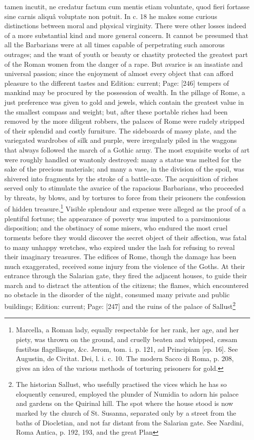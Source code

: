 {tamen incutit, ne credatur factum cum mentis etiam voluntate, quod fieri fortasse sine carnis aliquâ voluptate non potuit. In c. 18 he makes some curious distinctions between moral and physical virginity.} There were other losses indeed of a more substantial kind and more general concern. It cannot be presumed that all the Barbarians were at all times capable of perpetrating such amorous outrages; and the want of youth or beauty or chastity protected the greatest part of the Roman women from the danger of a rape. But avarice is an insatiate and universal passion; since the enjoyment of almost every object that can afford pleasure to the different tastes and Edition: current; Page: [246] tempers of mankind may be procured by the possession of wealth. In the pillage of Rome, a just preference was given to gold and jewels, which contain the greatest value in the smallest compass and weight; but, after these portable riches had been removed by the more diligent robbers, the palaces of Rome were rudely stripped of their splendid and costly furniture. The sideboards of massy plate, and the variegated wardrobes of silk and purple, were irregularly piled in the waggons that always followed the march of a Gothic army. The most exquisite works of art were roughly handled or wantonly destroyed: many a statue was melted for the sake of the precious materials; and many a vase, in the division of the spoil, was shivered into fragments by the stroke of a battle-axe. The acquisition of riches served only to stimulate the avarice of the rapacious Barbarians, who proceeded by threats, by blows, and by tortures to force from their prisoners the confession of hidden treasure.\footnote{Marcella, a Roman lady, equally respectable for her rank, her age, and her piety, was thrown on the ground, and cruelly beaten and whipped, cæsam fustibus flagellisque, \&c. Jerom, tom. i. p. 121, ad Principiam [ep. 16]. See Augustin, de Civitat. Dei, l. i. c. 10. The modern Sacco di Roma, p. 208, gives an idea of the various methods of torturing prisoners for gold.} Visible splendour and expense were alleged as the proof of a plentiful fortune; the appearance of poverty was imputed to a parsimonious disposition; and the obstinacy of some misers, who endured the most cruel torments before they would discover the secret object of their affection, was fatal to many unhappy wretches, who expired under the lash for refusing to reveal their imaginary treasures. The edifices of Rome, though the damage has been much exaggerated, received some injury from the violence of the Goths. At their entrance through the Salarian gate, they fired the adjacent houses, to guide their march and to distract the attention of the citizens; the flames, which encountered no obstacle in the disorder of the night, consumed many private and public buildings; Edition: current; Page: [247] and the ruins of the palace of Sallust\footnote{The historian Sallust, who usefully practised the vices which he has so eloquently censured, employed the plunder of Numidia to adorn his palace and gardens on the Quirinal hill. The spot where the house stood is now marked by the church of St. Susanna, separated only by a street from the baths of Diocletian, and not far distant from the Salarian gate. See Nardini, Roma Antica, p. 192, 193, and the great Plan }
